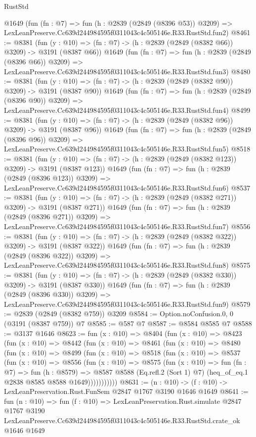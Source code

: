 \begin{lexlean}{RustStd}
\begin{coremodule}
    @1649
    (fun (fn : @7) =>
    fun (h : @2839 (@2849 (@8396 @53)) @3209) =>
    LexLeanPreserve.Cc639d244984595f0311043c4c505146e.R33.RustStd.fun2)
@8461 := @8381
    (fun (y : @10) => (fn : @7) -> (h : @2839 (@2849 (@8382 @66)) @3209) -> @3191 (@8387 @66))
    @1649
    (fun (fn : @7) =>
    fun (h : @2839 (@2849 (@8396 @66)) @3209) =>
    LexLeanPreserve.Cc639d244984595f0311043c4c505146e.R33.RustStd.fun3)
@8480 := @8381
    (fun (y : @10) => (fn : @7) -> (h : @2839 (@2849 (@8382 @90)) @3209) -> @3191 (@8387 @90))
    @1649
    (fun (fn : @7) =>
    fun (h : @2839 (@2849 (@8396 @90)) @3209) =>
    LexLeanPreserve.Cc639d244984595f0311043c4c505146e.R33.RustStd.fun4)
@8499 := @8381
    (fun (y : @10) => (fn : @7) -> (h : @2839 (@2849 (@8382 @96)) @3209) -> @3191 (@8387 @96))
    @1649
    (fun (fn : @7) =>
    fun (h : @2839 (@2849 (@8396 @96)) @3209) =>
    LexLeanPreserve.Cc639d244984595f0311043c4c505146e.R33.RustStd.fun5)
@8518 := @8381
    (fun (y : @10) => (fn : @7) -> (h : @2839 (@2849 (@8382 @123)) @3209) -> @3191 (@8387 @123))
    @1649
    (fun (fn : @7) =>
    fun (h : @2839 (@2849 (@8396 @123)) @3209) =>
    LexLeanPreserve.Cc639d244984595f0311043c4c505146e.R33.RustStd.fun6)
@8537 := @8381
    (fun (y : @10) => (fn : @7) -> (h : @2839 (@2849 (@8382 @271)) @3209) -> @3191 (@8387 @271))
    @1649
    (fun (fn : @7) =>
    fun (h : @2839 (@2849 (@8396 @271)) @3209) =>
    LexLeanPreserve.Cc639d244984595f0311043c4c505146e.R33.RustStd.fun7)
@8556 := @8381
    (fun (y : @10) => (fn : @7) -> (h : @2839 (@2849 (@8382 @322)) @3209) -> @3191 (@8387 @322))
    @1649
    (fun (fn : @7) =>
    fun (h : @2839 (@2849 (@8396 @322)) @3209) =>
    LexLeanPreserve.Cc639d244984595f0311043c4c505146e.R33.RustStd.fun8)
@8575 := @8381
    (fun (y : @10) => (fn : @7) -> (h : @2839 (@2849 (@8382 @330)) @3209) -> @3191 (@8387 @330))
    @1649
    (fun (fn : @7) =>
    fun (h : @2839 (@2849 (@8396 @330)) @3209) =>
    LexLeanPreserve.Cc639d244984595f0311043c4c505146e.R33.RustStd.fun9)
@8579 := @2839 (@2849 (@8382 @759)) @3209
@8584 := Option.noConfusion.{0, 0} (@3191 (@8387 @759)) @7
@8585 := @587 @7
@8587 := @8584 @8585 @7
@8588 := @3137 @1646
@8623 := fun (x : @10) =>
  @8404
    (fun (x : @10) =>
    @8423
      (fun (x : @10) =>
      @8442
        (fun (x : @10) =>
        @8461
          (fun (x : @10) =>
          @8480
            (fun (x : @10) =>
            @8499
              (fun (x : @10) =>
              @8518
                (fun (x : @10) =>
                @8537
                  (fun (x : @10) =>
                  @8556
                    (fun (x : @10) =>
                    @8575
                      (fun (x : @10) =>
                      fun (fn : @7) =>
                      fun (h : @8579) =>
                      @8587
                        @8588
                        (Eq.refl.{2} (Sort 1) @7)
                        (heq_of_eq.{1} @2838 @8585 @8588 @1649)))))))))))
@8631 := (n : @10) -> (f : @10) -> LexLeanPreservation.Rust.FunSem @2847 @1767 @3190 @1646 @1649
@8641 := fun (n : @10) =>
  fun (f : @10) =>
  LexLeanPreservation.Rust.simulate
    @2847
    @1767
    @3190
    LexLeanPreserve.Cc639d244984595f0311043c4c505146e.R33.RustStd.crate_ok
    @1646
    @1649
\end{coremodule}
\end{lexlean}
